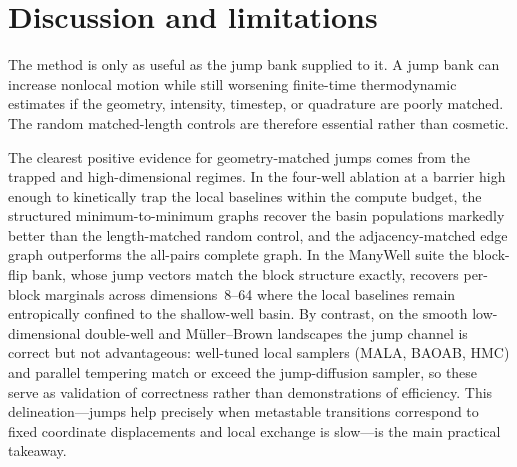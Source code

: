 \section{Discussion and limitations}
The method is only as useful as the jump bank supplied to it. A jump bank can increase nonlocal motion while still worsening finite-time thermodynamic estimates if the geometry, intensity, timestep, or quadrature are poorly matched. The random matched-length controls are therefore essential rather than cosmetic.

The clearest positive evidence for geometry-matched jumps comes from the trapped and high-dimensional regimes. In the four-well ablation at a barrier high enough to kinetically trap the local baselines within the compute budget, the structured minimum-to-minimum graphs recover the basin populations markedly better than the length-matched random control, and the adjacency-matched edge graph outperforms the all-pairs complete graph. In the ManyWell suite the block-flip bank, whose jump vectors match the block structure exactly, recovers per-block marginals across dimensions~8--64 where the local baselines remain entropically confined to the shallow-well basin. By contrast, on the smooth low-dimensional double-well and M\"uller--Brown landscapes the jump channel is correct but not advantageous: well-tuned local samplers (MALA, BAOAB, HMC) and parallel tempering match or exceed the jump-diffusion sampler, so these serve as validation of correctness rather than demonstrations of efficiency. This delineation---jumps help precisely when metastable transitions correspond to fixed coordinate displacements and local exchange is slow---is the main practical takeaway.


